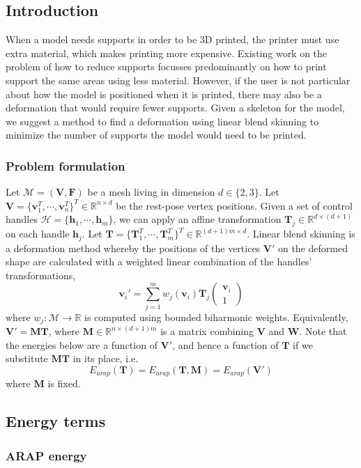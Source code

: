 \documentclass[10pt]{article}
\newcommand{\R}{\mathbb{R}}
\newcommand{\calM}{\mathcal{M}}
\newcommand{\calH}{\mathcal{H}}
\newcommand{\bV}{\mathbf{V}}
\newcommand{\bF}{\mathbf{F}}
\newcommand{\bW}{\mathbf{W}}
\newcommand{\bM}{\mathbf{M}}
\newcommand{\bT}{\mathbf{T}}
\newcommand{\bv}{\mathbf{v}}
\newcommand{\bh}{\mathbf{h}}
\begin{document}
\begin{multicols}{2}

\subsection*{Introduction}
When a model needs supports in order to be 3D printed, the printer must use extra material, which makes printing more expensive. Existing work on the problem of how to reduce supports focusses predominantly on how to print support the same areas using less material. However, if the user is not particular about how the model is positioned when it is printed, there may also be a deformation that would require fewer supports. Given a skeleton for the model, we suggest a method to find a deformation using linear blend skinning to minimize the number of supports the model would need to be printed.

\subsubsection*{Problem formulation}
Let $\calM = (\bV, \bF)$ be a mesh living in dimension $d\in \{2,3\}$. Let $\bV = \{\bv_1^T, \cdots, \bv_n^T\}^T \in \R^{n \times d}$ be the rest-pose vertex positions. Given a set of control handles $\calH = \{ \bh_1, \cdots, \bh_m \}$, we can apply an affine transformation $\bT_j \in \R^{d \times (d+1)}$ on each handle $\bh_j$. Let $\bT = \{ \bT_1^T, \cdots, \bT_m^T \}^T \in \R^{(d+1)m \times d}$. Linear blend skinning is a deformation method whereby the positions of the vertices $\bV'$ on the deformed shape are calculated with a weighted linear combination of the handles' transformations,
\[
    \bv_i' = \sum_{j=1}^m w_j(\bv_i) \bT_j 
    \begin{pmatrix} 
    \bv_i \\
    1
    \end{pmatrix} 
\]
where $w_j: \calM \rightarrow \R$ is computed using bounded biharmonic weights. Equivalently, $\bV' = \bM \bT$, where $\bM \in \R^{n \times (d+1)m}$ is a matrix combining $\bV$ and $\bW$. Note that the energies below are a function of $\bV'$, and hence a function of $\bT$ if we substitute $\bM \bT$ in its place, i.e. 
\[
    E_{arap}(\bT) = E_{arap}(\bT, \bM) = E_{arap}(\bV')
\]
where $\bM$ is fixed.

\subsection*{Energy terms}
\subsubsection*{ARAP energy}


\end{multicols}
\end{document}
